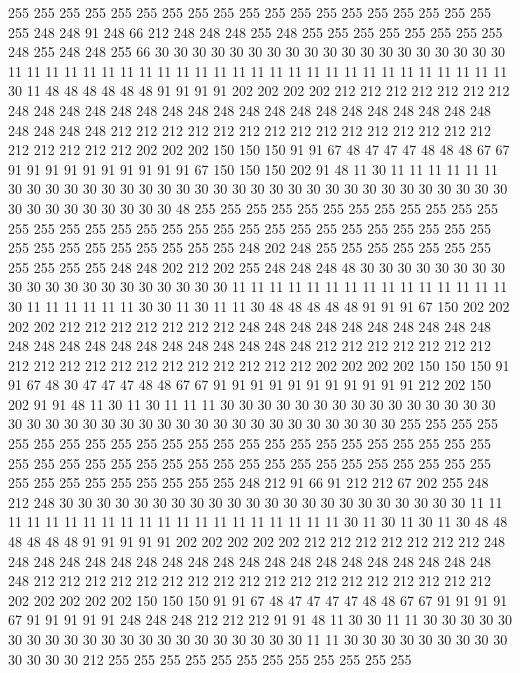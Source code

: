 255 255 255 255 255 255 255 255 255 255 255 255 255 255 255 255 255 255 255 255
248 248 91 248 66 212 248 248 248 255 248 255 255 255 255 255 255 255 255 248
255 248 248 255 66 30 30 30 30 30 30 30 30 30 30 30 30 30 30 30
30 30 30 30 11 11 11 11 11 11 11 11 11 11 11 11 11 11 11 11
11 11 11 11 11 11 11 11 11 11 11 30 11 48 48 48 48 48 48 91
91 91 91 202 202 202 202 212 212 212 212 212 212 212 248 248 248 248 248 248
248 248 248 248 248 248 248 248 248 248 248 248 248 248 248 248 248 212 212 212
212 212 212 212 212 212 212 212 212 212 212 212 212 212 212 212 212 202 202 202
150 150 150 91 91 67 48 47 47 47 48 48 48 67 67 91 91 91 91 91
91 91 91 91 91 67 150 150 150 202 91 48 11 30 11 11 11 11 11 11
30 30 30 30 30 30 30 30 30 30 30 30 30 30 30 30 30 30 30 30
30 30 30 30 30 30 30 30 30 30 30 30 30 30 30 30 48 255 255 255
255 255 255 255 255 255 255 255 255 255 255 255 255 255 255 255 255 255 255 255
255 255 255 255 255 255 255 255 255 255 255 255 255 255 255 255 255 248 202 248
255 255 255 255 255 255 255 255 255 255 255 248 248 202 212 202 255 248 248 248
48 30 30 30 30 30 30 30 30 30 30 30 30 30 30 30 30 30 30 30
30 11 11 11 11 11 11 11 11 11 11 11 11 11 11 11 30 11 11 11
11 11 11 30 30 11 30 11 11 30 48 48 48 48 48 91 91 91 67 150
202 202 202 202 212 212 212 212 212 212 212 248 248 248 248 248 248 248 248 248
248 248 248 248 248 248 248 248 248 248 248 248 248 212 212 212 212 212 212 212
212 212 212 212 212 212 212 212 212 212 212 212 202 202 202 202 150 150 150 91
91 67 48 30 47 47 47 48 48 67 67 91 91 91 91 91 91 91 91 91
91 91 212 202 150 202 91 91 48 11 30 11 30 11 11 11 30 30 30 30
30 30 30 30 30 30 30 30 30 30 30 30 30 30 30 30 30 30 30 30
30 30 30 30 30 30 30 30 30 30 30 30 255 255 255 255 255 255 255 255
255 255 255 255 255 255 255 255 255 255 255 255 255 255 255 255 255 255 255 255
255 255 255 255 255 255 255 255 255 255 255 255 255 255 255 255 255 255 255 255
255 255 255 248 212 91 66 91 212 212 67 202 255 248 212 248 30 30 30 30
30 30 30 30 30 30 30 30 30 30 30 30 30 30 30 30 30 30 11 11
11 11 11 11 11 11 11 11 11 11 11 11 11 11 11 11 11 11 30 11
30 11 30 11 30 48 48 48 48 48 48 91 91 91 91 91 202 202 202 202
202 212 212 212 212 212 212 212 248 248 248 248 248 248 248 248 248 248 248 248
248 248 248 248 248 248 248 248 248 212 212 212 212 212 212 212 212 212 212 212
212 212 212 212 212 212 212 202 202 202 202 202 150 150 150 91 91 67 48 47
47 47 47 48 48 67 67 91 91 91 91 67 91 91 91 91 91 248 248 248
212 212 212 91 91 48 11 30 30 11 11 30 30 30 30 30 30 30 30 30
30 30 30 30 30 30 30 30 30 30 30 30 11 11 30 30 30 30 30 30
30 30 30 30 30 30 30 212 255 255 255 255 255 255 255 255 255 255 255 255
